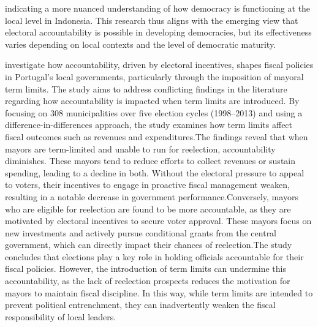 indicating a more nuanced understanding of how democracy is functioning at the local level in Indonesia. This research thus aligns with the emerging view that electoral accountability is possible in developing democracies, but its effectiveness varies depending on local contexts and the level of democratic maturity.\par
    investigate how accountability, driven by electoral incentives, shapes fiscal policies in Portugal’s local governments, particularly through the imposition of mayoral term limits. The study aims to address conflicting findings in the literature regarding how accountability is impacted when term limits are introduced. By focusing on 308 municipalities over five election cycles (1998–2013) and using a difference-in-differences approach, the study examines how term limits affect fiscal outcomes such as revenues and expenditures.The findings reveal that when mayors are term-limited and unable to run for reelection, accountability diminishes. These mayors tend to reduce efforts to collect revenues or sustain spending, leading to a decline in both. Without the electoral pressure to appeal to voters, their incentives to engage in proactive fiscal management weaken, resulting in a notable decrease in government performance.Conversely, mayors who are eligible for reelection are found to be more accountable, as they are motivated by electoral incentives to secure voter approval. These mayors focus on new investments and actively pursue conditional grants from the central government, which can directly impact their chances of reelection.The study concludes that elections play a key role in holding officials accountable for their fiscal policies. However, the introduction of term limits can undermine this accountability, as the lack of reelection prospects reduces the motivation for mayors to maintain fiscal discipline. In this way, while term limits are intended to prevent political entrenchment, they can inadvertently weaken the fiscal responsibility of local leaders.\par
